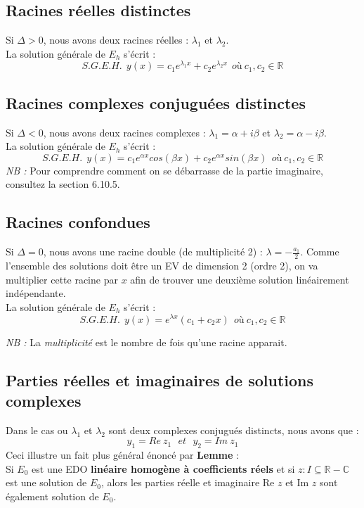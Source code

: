 \documentclass	[11pt, a4paper, openany]{book}
\begin{document}
\subsection{Racines réelles distinctes}
Si $\Delta > 0$, nous avons deux racines réelles : $\lambda_1$ et $\lambda_2$.\\La solution générale de $E_h$ s'écrit :
$$S.G.E.H.\ \ y(x) = c_1e^{\lambda_1 x} + c_2e^{\lambda_2 x}\ \ où\ c_1, c_2 \in \mathbb{R}$$

\subsection{Racines complexes conjuguées distinctes}
Si $\Delta < 0$, nous avons deux racines complexes : $\lambda_1 = \alpha +i\beta$ et $\lambda_2 = \alpha -i\beta$.\\
La solution générale de $E_h$ s'écrit :
$$S.G.E.H.\ \ y(x) = c_1e^{\alpha x} cos(\beta x) +c_2e^{\alpha x} sin(\beta x)\ \ où\ c_1, c_2 \in \mathbb{R}$$
\textit{NB :} Pour comprendre comment on se débarrasse de la partie imaginaire, consultez la section 6.10.5.

\subsection{Racines confondues}
Si $\Delta = 0$, nous avons une racine double (de multiplicité 2) : $\lambda = -\frac{a_1}{2}$. Comme l'ensemble des solutions doit être un EV de dimension 2 (ordre 2), on va multiplier cette racine par $x$ afin de trouver une deuxième solution linéairement indépendante.\\
 La solution générale de $E_h$ s'écrit :
$$S.G.E.H.\ \ y(x) = e^{\lambda x}(c_1 + c_2x)\ \ où\ c_1, c_2 \in \mathbb{R}$$ 

\textit{NB :} La \textit{multiplicité} est le nombre de fois qu'une racine apparait. 

\subsection{Parties réelles et imaginaires de solutions complexes}
Dans le cas ou $\lambda_1$ et $\lambda_2$ sont deux complexes conjugués distincts, nous avons que :
$$y_1 = Re\ z_1\ \ \ et\ \  \ y_2 = Im\ z_1$$
Ceci illustre un fait plus général énoncé par \textbf{Lemme} :\\
Si $E_0$ est une EDO \textbf{linéaire homogène à coefficients réels} et si $z : I \subseteq \mathbb{R} - \mathbb{C}$ est une solution de $E_0$, alors les parties réelle et imaginaire Re $z$ et Im $z$ sont également solution de $E_0$.
\end{document}
